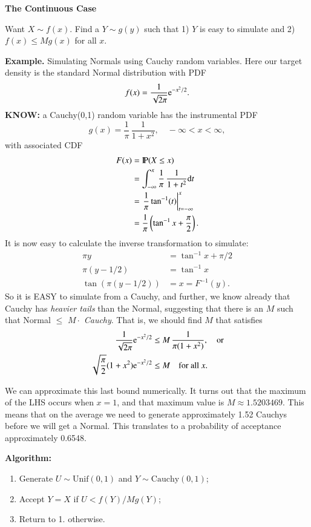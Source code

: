 \documentclass[11pt,english]{scrbook}
\begin{document}
\textbf{The Continuous Case}

Want \(X\sim f(x)\). Find a \(Y\sim g(y)\) such that 1) \(Y\) is easy to simulate and 2) \(f(x)\leq Mg(x)\) for all \(x\).

\textbf{Example.} Simulating Normals using Cauchy random variables.
Here our target density is the standard Normal distribution with PDF
\[
f(x) = \frac{1}{\sqrt{2\pi}} \mathrm{e}^{-x^{2}/2}.
\]
\textbf{KNOW:} a Cauchy(0,1) random variable has the instrumental PDF
\[
g(x)=\frac{1}{\pi}\,\frac{1}{1+x^{2}},\quad -\infty < x < \infty,
\]
with associated CDF
\begin{align*}
F(x) & =\mathrm{I\hspace{-1.5pt}P}(X\leq x)\\
 & =\int_{-\infty}^{x}\frac{1}{\pi}\,\frac{1}{1+t^{2}}\mathrm{d} t\\
 & =\left.\frac{1}{\pi}\tan^{-1}(t)\right|_{t=-\infty}^{x}\\
 & =\frac{1}{\pi}\left(\tan^{-1}x+\frac{\pi}{2}\right).
\end{align*}
It is now easy to calculate the inverse transformation to simulate:
\begin{align*}
\pi y & =\tan^{-1}x+\pi/2\\
\pi(y-1/2) & =\tan^{-1}x\\
\tan(\pi(y-1/2)) & =x=F^{-1}(y).
\end{align*}
So it is EASY to simulate from a Cauchy, and further, we know already that Cauchy has \emph{heavier tails} than the Normal, suggesting that there is an \(M\) such that Normal \(\leq\) \(M\cdot\) \emph{Cauchy}.  That is, we should find \(M\) that satisfies 
\begin{align*}
\frac{1}{\sqrt{2\pi}} \mathrm{e}^{-x^{2}/2} & \leq M\,\frac{1}{\pi(1+x^{2})},\quad\mbox{or}\\
\sqrt{\frac{\pi}{2}}(1+x^{2}) \mathrm{e}^{-x^{2}/2} & \leq M\quad\mbox{for all \ensuremath{x}.}
\end{align*}

We can approximate this last bound numerically. It turns out that the maximum of the LHS occurs when \(x=1\), and that maximum value is \(M \approx 1.5203469\). This means that on the average we need to generate approximately 1.52 Cauchys before we will get a Normal. This translates to a probability of acceptance approximately 0.6548.

\textbf{Algorithm:}
\begin{enumerate}
\item Generate \(U \sim \mathrm{Unif}(0,1)\) and \(Y \sim \mathrm{Cauchy}(0,1)\);
\item Accept \(Y = X\) if \(U < f(Y)/Mg(Y)\);
\item Return to 1. otherwise.
\end{enumerate}
\end{document}
